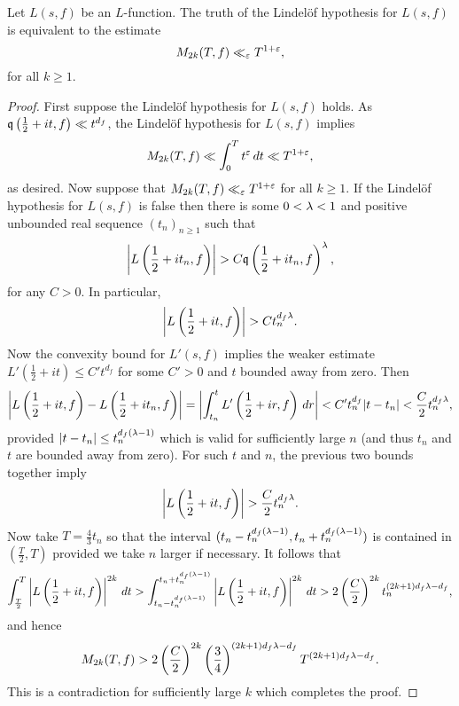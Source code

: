   \begin{proposition}\label{prop:equivalence_Lindelof_hypothesis_and_moments}
    Let $L(s,f)$ be an $L$-function. The truth of the Lindel\"of hypothesis for $L(s,f)$ is equivalent to the estimate
    \[
      M_{2k}(T,f) \ll_{\varepsilon} T^{1+\varepsilon},
    \]
    for all $k \ge 1$.
  \end{proposition}
  \begin{proof}
    First suppose the Lindel\"of hypothesis for $L(s,f)$ holds. As $\mathfrak{q}\left(\frac{1}{2}+it,f\right) \ll t^{d_{f}}$, the Lindel\"of hypothesis for $L(s,f)$ implies
    \[
      M_{2k}(T,f) \ll \int_{0}^{T}t^{\varepsilon}\,dt \ll T^{1+\varepsilon},
    \]
    as desired. Now suppose that $M_{2k}(T,f) \ll_{\varepsilon} T^{1+\varepsilon}$ for all $k \ge 1$. If the Lindel\"of hypothesis for $L(s,f)$ is false then there is some $0 < \lambda < 1$ and positive unbounded real sequence $(t_{n})_{n \ge 1}$ such that
    \[
      \left|L\left(\frac{1}{2}+it_{n},f\right)\right| > C\mathfrak{q}\left(\frac{1}{2}+it_{n},f\right)^{\lambda},
    \]
    for any $C > 0$. In particular,
      \[
      \left|L\left(\frac{1}{2}+it,f\right)\right| > Ct_{n}^{d_{f}\lambda}.
    \]
    Now the convexity bound for $L'(s,f)$ implies the weaker estimate $L'\left(\frac{1}{2}+it\right) \le C't^{d_{f}}$ for some $C' > 0$ and $t$ bounded away from zero. Then
    \[
      \left|L\left(\frac{1}{2}+it,f\right)-L\left(\frac{1}{2}+it_{n},f\right)\right| = \left|\int_{t_{n}}^{t}L'\left(\frac{1}{2}+ir,f\right)\,dr\right| < C't_{n}^{d_{f}}|t-t_{n}| < \frac{C}{2}t_{n}^{d_{f}\lambda},
    \]
    provided $|t-t_{n}| \le t_{n}^{d_{f}(\lambda-1)}$ which is valid for sufficiently large $n$ (and thus $t_{n}$ and $t$ are bounded away from zero). For such $t$ and $n$, the previous two bounds together imply
    \[
      \left|L\left(\frac{1}{2}+it,f\right)\right| > \frac{C}{2}t_{n}^{d_{f}\lambda}.
    \]
    Now take $T = \frac{4}{3}t_{n}$ so that the interval $(t_{n}-t_{n}^{d_{f}(\lambda-1)},t_{n}+t_{n}^{d_{f}(\lambda-1)})$ is contained in $\left(\frac{T}{2},T\right)$ provided we take $n$ larger if necessary. It follows that
    \[
      \int_{\frac{T}{2}}^{T}\left|L\left(\frac{1}{2}+it,f\right)\right|^{2k}\,dt > \int_{t_{n}-t_{n}^{d_{f}(\lambda-1)}}^{t_{n}+t_{n}^{d_{f}(\lambda-1)}}\left|L\left(\frac{1}{2}+it,f\right)\right|^{2k}\,dt > 2\left(\frac{C}{2}\right)^{2k}t_{n}^{(2k+1)d_{f}\lambda-d_{f}},
    \]
    and hence
    \[
      M_{2k}(T,f) > 2\left(\frac{C}{2}\right)^{2k}\left(\frac{3}{4}\right)^{(2k+1)d_{f}\lambda-d_{f}}T^{(2k+1)d_{f}\lambda-d_{f}}.
    \]
    This is a contradiction for sufficiently large $k$ which completes the proof.
  \end{proof}

